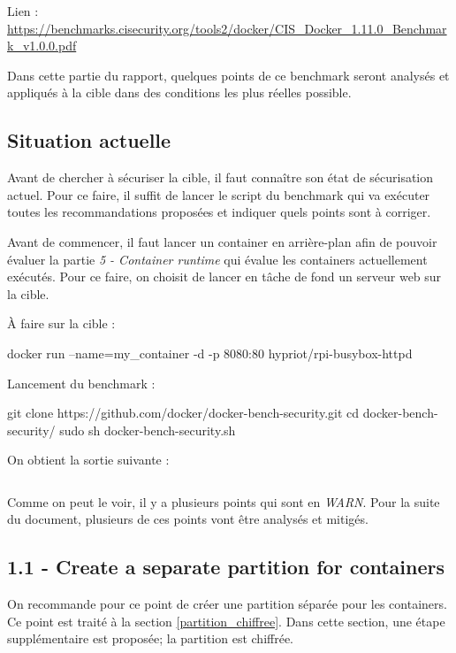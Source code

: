 \documentclass[11pt,a4paper,oneside]{report}
\begin{document}
Lien : \url{https://benchmarks.cisecurity.org/tools2/docker/CIS_Docker_1.11.0_Benchmark_v1.0.0.pdf}

Dans cette partie du rapport, quelques points de ce benchmark seront analysés et appliqués à la cible dans des conditions les plus réelles possible.

\subsection{Situation actuelle}
Avant de chercher à sécuriser la cible, il faut connaître son état de sécurisation actuel. Pour ce faire, il suffit de lancer le script du benchmark qui va exécuter toutes les recommandations proposées et indiquer quels points sont à corriger.

Avant de commencer, il faut lancer un container en arrière-plan afin de pouvoir évaluer la partie \textit{5 - Container runtime} qui évalue les containers actuellement exécutés. Pour ce faire, on choisit de lancer en tâche de fond un serveur web sur la cible.

À faire sur la cible :
\begin{bashcode}
docker run --name=my_container -d -p 8080:80 hypriot/rpi-busybox-httpd
\end{bashcode}

Lancement du benchmark :
\begin{bashcode}
git clone https://github.com/docker/docker-bench-security.git
cd docker-bench-security/
sudo sh docker-bench-security.sh
\end{bashcode}

On obtient la sortie suivante :

\inputminted[xleftmargin=20pt, linenos=true, breaklines=true, frame=single, framesep=6pt, tabsize=2, fontfamily=courier, fontsize=\small]{text}{../../docker_security_benchmark/vanilla.log}


Comme on peut le voir, il y a plusieurs points qui sont en \textit{WARN}. Pour la suite du document, plusieurs de ces points vont être analysés et mitigés.


\subsection{1.1  - Create a separate partition for containers}
On recommande pour ce point de créer une partition séparée pour les containers. Ce point est traité à la section \ref{partition_chiffree}. Dans cette section, une étape supplémentaire est proposée; la partition est chiffrée.
\end{document}
